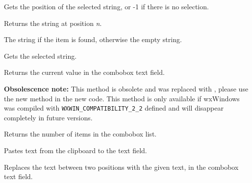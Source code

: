 \label{wxcomboboxgetselection}


Gets the position of the selected string, or -1 if there is no selection.

\label{wxcomboboxgetstring}


Returns the string at position {\it n}.




The string if the item is found, otherwise the empty string.

\label{wxcomboboxgetstringselection}


Gets the selected string.

\label{wxcomboboxgetvalue}


Returns the current value in the combobox text field.

\label{wxcomboboxnumber}


{\bf Obsolescence note:} This method is obsolete and was replaced with 
, please use the new method in the new
code. This method is only available if wxWindows was compiled with 
{\tt WXWIN\_COMPATIBILITY\_2\_2} defined and will disappear completely in
future versions.

Returns the number of items in the combobox list.

\label{wxcomboboxpaste}


Pastes text from the clipboard to the text field.

\label{wxcomboboxreplace}


Replaces the text between two positions with the given text, in the combobox text field.

